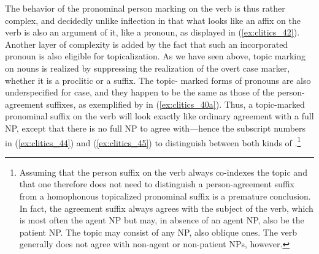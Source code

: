 \ex\label{ex:clitics_44}
\xe

The behavior of the pronominal person marking on the verb is thus rather
complex, and decidedly unlike inflection in that what looks like an affix on
the verb is also an argument of it, like a pronoun, as displayed in
(\ref{ex:clitics_42}). Another layer of complexity is added by the fact that
such an incorporated pronoun is also eligible for topicalization. As we have
seen above, topic marking on nouns is realized by suppressing the realization
of the overt case marker, whether it is a proclitic or a suffix. The topic-
marked forms of pronouns are also underspecified for case, and they happen to
be the same as those of the person-agreement suffixes, as exemplified by
 in (\ref{ex:clitics_40a}). Thus, a topic-marked pronominal
suffix on the verb will look exactly like ordinary agreement with a full NP,
except that there is no full NP to agree with---hence the subscript numbers in
(\ref{ex:clitics_44}) and (\ref{ex:clitics_45}) to distinguish between both
kinds of .\footnote{Assuming that the person suffix on the verb
always co-indexes the topic and that one therefore does not need to distinguish
a person-agreement suffix from a homophonous topicalized pronominal suffix is a
premature conclusion. In fact, the agreement suffix always agrees with the
subject of the verb, which is most often the agent NP but may, in absence of an
agent NP, also be the patient NP. The topic may consist of any NP, also oblique
ones. The verb generally does not agree with non-agent or non-patient NPs, 
however.}

\ex\label{ex:clitics_45}
\xe

